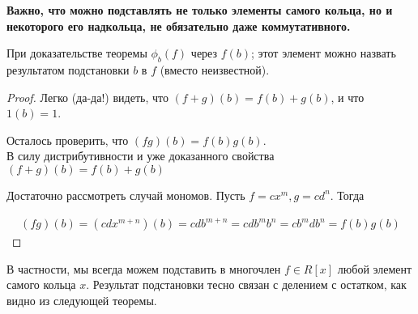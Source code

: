 \begin{normalsize}
    \textbf{Важно, что можно подставлять не только элементы самого кольца,
    но и некоторого его надкольца, не обязательно даже коммутативного.}


    При доказательстве теоремы $\phi_b(f)$ через $f(b)$; этот элемент можно назвать результатом подстановки $b$ в $f$ (вместо неизвестной).
    
    \begin{proof}
        Легко (да-да!) видеть, что $(f+g)(b) = f(b) + g(b)$, и что $1(b) = 1$.
        
        Осталось проверить, что $(fg)(b) = f(b)g(b)$. \\
        В силу дистрибутивности и уже доказанного свойства $(f + g)(b) = f(b) + g(b)$

        Достаточно рассмотреть случай мономов. Пусть $f = cx^m, g = cd^n$. Тогда
        
        \begin{align*}
            (fg)(b) = (cdx^{m+n})(b) = cdb^{m+n} = cdb^mb^n = cb^mdb^n = f(b)g(b)
        \end{align*}
    \end{proof}

    В частности, мы всегда можем подставить в многочлен $f \in R[x]$
    любой элемент самого кольца $x$. Результат подстановки тесно связан с делением с остатком, 
    как видно из следующей теоремы.






















\end{normalsize}

